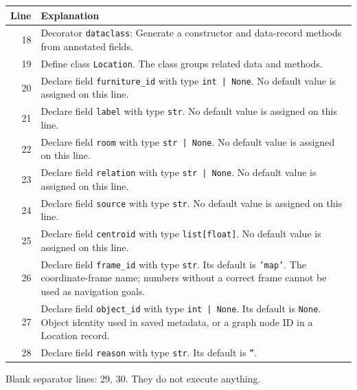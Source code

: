 \documentclass[11pt,a4paper]{book}
\begin{document}
\begin{longtable}{r p{}}

\textbf{Line} & \textbf{Explanation} \\ \hline \endhead

18 & Decorator \texttt{dataclass}: Generate a constructor and data-record methods from annotated fields. \\

19 & Define class \texttt{Location}. The class groups related data and methods. \\

20 & Declare field \texttt{furniture\_id} with type \texttt{int | None}. No default value is assigned on this line. \\

21 & Declare field \texttt{label} with type \texttt{str}. No default value is assigned on this line. \\

22 & Declare field \texttt{room} with type \texttt{str | None}. No default value is assigned on this line. \\

23 & Declare field \texttt{relation} with type \texttt{str | None}. No default value is assigned on this line. \\

24 & Declare field \texttt{source} with type \texttt{str}. No default value is assigned on this line. \\

25 & Declare field \texttt{centroid} with type \texttt{list[float]}. No default value is assigned on this line. \\

26 & Declare field \texttt{frame\_id} with type \texttt{str}. Its default is \texttt{'map'}. The coordinate-frame name; numbers without a correct frame cannot be used as navigation goals. \\

27 & Declare field \texttt{object\_id} with type \texttt{int | None}. Its default is \texttt{None}. Object identity used in saved metadata, or a graph node ID in a Location record. \\

28 & Declare field \texttt{reason} with type \texttt{str}. Its default is \texttt{''}.  \\

\end{longtable}

Blank separator lines: 29, 30. They do not execute anything.
\end{document}
